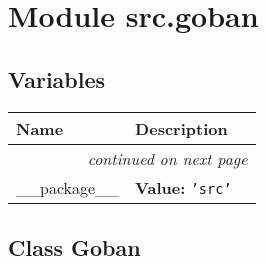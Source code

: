 %
%
%


\section{Module src.goban}

    \label{src:goban}


  \subsection{Variables}

    \vspace{-1cm}
\hspace{\varindent}\begin{longtable}{|p{\varnamewidth}|p{\vardescrwidth}|l}
\cline{1-2}
\cline{1-2} \centering \textbf{Name} & \centering \textbf{Description}& \\
\cline{1-2}
\endhead\cline{1-2}\multicolumn{3}{r}{\small\textit{continued on next page}}\\\endfoot\cline{1-2}
\endlastfoot\raggedright \_\-\_\-p\-a\-c\-k\-a\-g\-e\-\_\-\_\- & \raggedright \textbf{Value:} 
{\tt \texttt{'}\texttt{src}\texttt{'}}&\\
\cline{1-2}
\end{longtable}



\subsection{Class Goban}

